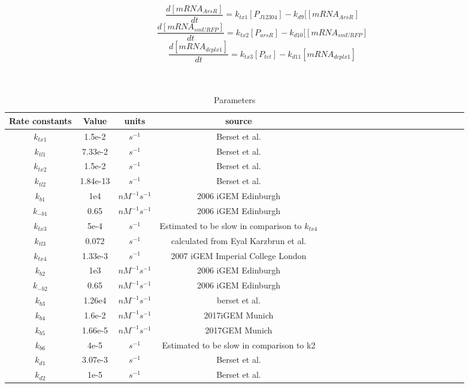 \begin{equation}
\frac{d[mRNA_{ArsR}]}{dt}=k_{tx1}[P_{J12304}]-k_{d9}[[mRNA_{ArsR}] \tag{13}
\end{equation}
\begin{equation}
\frac{d[mRNA_{smURFP}]}{dt}=k_{tx2}[P_{arsR}]-k_{d10}[[mRNA_{smURFP}] \tag{14}
\end{equation}
\begin{equation}
\frac{d[mRNA_{dcplx1}]}{dt}=k_{tx3}[P_{tet}]-k_{d11}[mRNA_{dcplx1}] \tag{15}
\end{equation}
\\\\
\begin{table}[htbp]
	\centering
	\caption{\label {tab:test} Parameters}
	\begin{tabular}{ccccccccccccccccccccc}
		\toprule
		Rate constants & Value& units & source \\
		\midrule
		$k_{tx1}$ & 1.5e-2&$s^{-1} $& Berset et al. \\
		$k_{tl1}$ & 7.33e-2 &$s^{-1} $& Berset et al.\\
		$k_{tx2}$ & 1.5e-2 & $s^{-1}$ & Berset et al.\\
		$k_{tl2} $&1.84e-13&$s^{-1}$& Berset et al.\\
		$k_{b1} $& 1e4   & $nM^{-1}s^{-1}$ &2006 iGEM Edinburgh  \\
		$k_{-b1}$ & 0.65    & $nM^{-1}s^{-1}$ &2006 iGEM Edinburgh   \\
		$k_{tx3}$& 5e-4 &$s^{-1}$&Estimated to be slow in comparison to $k_{tx4} $\\
		$k_{tl3} $& 0.072   & $s^{-1}$ & calculated from Eyal Karzbrun et al.  \\
		$k_{tx4} $& 1.33e-3 &$s^{-1}$&2007 iGEM Imperial College London \\
		$k_{b2} $& 1e3   & $nM^{-1}s^{-1}$ &2006 iGEM Edinburgh  \\
		$k_{-b2} $& 0.65    & $nM^{-1}s^{-1}$ &2006 iGEM Edinburgh   \\
		$k_{b3}  $&1.26e4 &$nM^{-1}s^{-1}$ & berset et al. \\
		$k_{b4}$&1.6e-2& $nM^{-1}s^{-1}$& 2017iGEM Munich\\
		$k_{b5} $&1.66e-5&$nM^{-1}s^{-1}$&  2017GEM Munich\\ 
		$k_{b6}$&4e-5&$s^{-1} $& Estimated to be slow in comparison to k2 \\
		$k_{d1} $& 3.07e-3&$s^{-1} $ & Berset et al.\\
		$k_{d2}$&1e-5&$s^{-1} $ & Berset et al.\\

\end{tabular}
\end{table}
